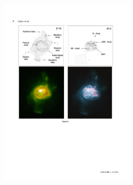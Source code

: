 \documentclass[useAMS, usenatbib]{mnras}
\begin{document}
\begin{figure}
\centering
\includegraphics[width=0.6\textwidth]{sketch}

  \caption{}
\end{figure}
















\clearpage
\end{document}
